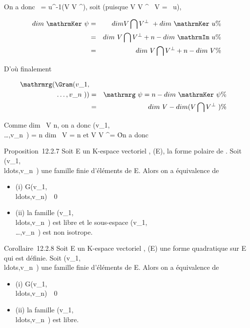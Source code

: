 \documentclass[]{article}
\begin{document}
On a donc \mathrmKer~\psi =
u^-1(V \bigcap V ^\bot), soit (puisque V \bigcap V ^\bot\subset~
V = \mathrmIm~u),

\begin{align*} dim~
\mathrmKer~\psi& =&
dim V \bigcap V ^\bot~
+ dim~
\mathrmKer~u \%&
\\ & =& dim~ V
\bigcap V ^\bot + n - dim~
\mathrmIm~u\%&
\\ & =& dim~ V
\bigcap V ^\bot + n - dim~ V \%&
\\ \end{align*}

D'où finalement

\begin{align*}
\mathrmrg(\Gram(v\_1,\\\ldots,v\_n~))&
=& \mathrmrg~\psi = n
- dim~
\mathrmKer~\psi \%&
\\ & =& dim~ V
- dim (V \bigcap V ^\bot~)\%&
\\ \end{align*}

Comme dim~ V \leq n, on a donc
\mathrmrg\Gram(v\_1,\\\ldots,v\_n~)
= n \Leftrightarrow dim~ V = n et
V \bigcap V ^\bot = \0\. On a donc

Proposition~12.2.7 Soit E un K-espace vectoriel , \Phi \inQ(E), \phi la forme
polaire de \Phi. Soit
(v\_1,\\ldots,v\_n~)
une famille finie d'éléments de E. Alors on a équivalence de

\begin{itemize}
\itemsep1pt\parskip0pt
\item
  (i)
  G(v\_1,\\ldots,v\_n)\mathrel\neq~~0
\item
  (ii) la famille
  (v\_1,\\ldots,v\_n~)
  est libre et le sous-espace
  \mathrmVect(v\_1,\\\ldots,v\_n~)
  est non isotrope.
\end{itemize}

Corollaire~12.2.8 Soit E un K-espace vectoriel , \Phi \inQ(E) une forme
quadratique sur E qui est définie. Soit
(v\_1,\\ldots,v\_n~)
une famille finie d'éléments de E. Alors on a équivalence de

\begin{itemize}
\itemsep1pt\parskip0pt
\item
  (i)
  G(v\_1,\\ldots,v\_n)\mathrel\neq~~0
\item
  (ii) la famille
  (v\_1,\\ldots,v\_n~)
  est libre.
\end{itemize}
\end{document}
